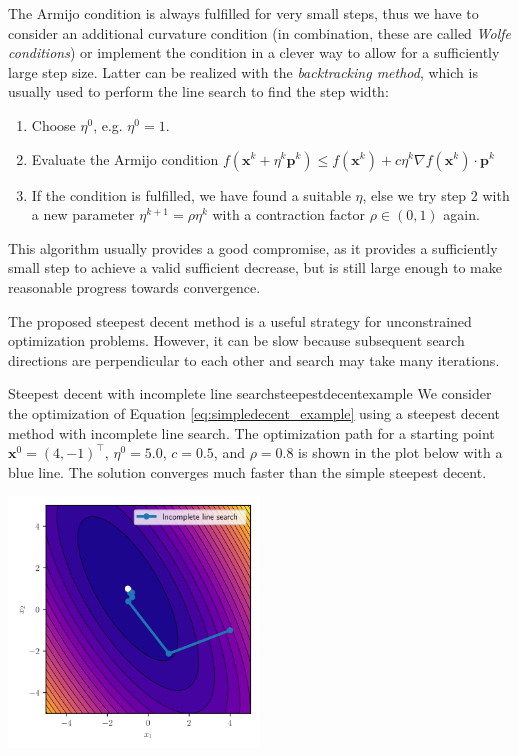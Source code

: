 The Armijo condition is always fulfilled for very small steps, thus we have to consider an additional curvature condition (in combination, these are called \emph{Wolfe conditions}) or implement the condition in a clever way to allow for a sufficiently large step size. Latter can be realized with the \emph{backtracking method}, which is usually used to perform the line search to find the step width: 
\begin{enumerate}
    \item Choose $\eta^0$, e.g. $\eta^0=1$.
    \item Evaluate the Armijo condition $f(\mathbf{x}^k + \eta^k \mathbf{p}^k) \le f(\mathbf{x}^k) + c \eta^k \nabla f(\mathbf{x}^k) \cdot \mathbf{p}^k $
    \item If the condition is fulfilled, we have found a suitable $\eta$, else we try step 2 with a new parameter $\eta^{k+1}=\rho \eta^k$ with a contraction factor $\rho \in (0,1)$ again.
\end{enumerate}
This algorithm usually provides a good compromise, as it provides a sufficiently small step to achieve a valid sufficient decrease, but is still large enough to make reasonable progress towards convergence.

The proposed steepest decent method is a useful strategy for unconstrained optimization problems. However, it can be slow because subsequent search directions are perpendicular to each other and search may take many iterations.

\begin{example}{Steepest decent with incomplete line search}{steepestdecentexample}
    We consider the optimization of Equation \eqref{eq:simpledecent_example} using a steepest decent method with incomplete line search. The optimization path for a starting point $\mathbf{x}^0= (4, -1)^\top$, $\eta^0=5.0$, $c=0.5$, and $\rho=0.8$ is shown in the plot below with a blue line. The solution converges much faster than the simple steepest decent.
    \begin{center}
        \includegraphics[width=0.5\textwidth]{figures/steepest_decent.svg}
    \end{center}   
\end{example}

